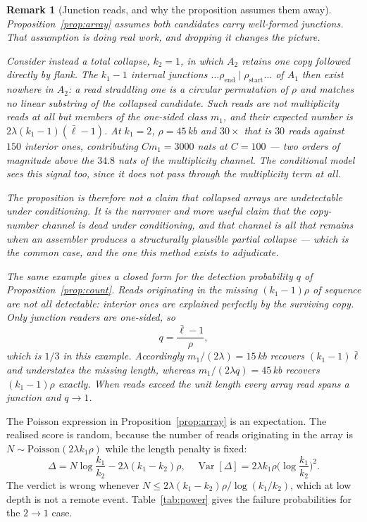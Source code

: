 \documentclass[11pt]{article}
\newtheorem{remark}{Remark}
\begin{document}
\begin{remark}[Junction reads, and why the proposition assumes them away]
\label{rem:junction}
Proposition~\ref{prop:array} assumes both candidates carry well-formed
junctions.  That assumption is doing real work, and dropping it changes the
picture.

Consider instead a \emph{total} collapse, $k_2 = 1$, in which $A_2$ retains one
copy followed directly by flank.  The $k_1-1$ internal junctions
$\ldots\rho_{\mathrm{end}}\mid\rho_{\mathrm{start}}\ldots$ of $A_1$ then exist
nowhere in $A_2$: a read straddling one is a circular permutation of $\rho$ and
matches no linear substring of the collapsed candidate.  Such reads are not
multiplicity reads at all but members of the one-sided class $m_1$, and their
expected number is $2\lambda(k_1-1)(\bar\ell-1)$.  At $k_1=2$,
$\rho=45$\,kb and $30\times$ that is $30$ reads against $150$ interior ones,
contributing $C m_1 = 3000$ nats at $C=100$ --- two orders of magnitude above
the $34.8$ nats of the multiplicity channel.  The conditional model sees this
signal too, since it does not pass through the multiplicity term at all.

The proposition is therefore not a claim that collapsed arrays are undetectable
under conditioning.  It is the narrower and more useful claim that the
\emph{copy-number channel} is dead under conditioning, and that channel is all
that remains when an assembler produces a structurally plausible partial
collapse --- which is the common case, and the one this method exists to
adjudicate.

The same example gives a closed form for the detection probability $q$ of
Proposition~\ref{prop:count}.  Reads originating in the missing $(k_1-1)\rho$
of sequence are not all detectable: interior ones are explained perfectly by
the surviving copy.  Only junction readers are one-sided, so
\begin{equation}
    q = \frac{\bar\ell-1}{\rho},
\end{equation}
which is $1/3$ in this example.  Accordingly $m_1/(2\lambda) = 15$\,kb
recovers $(k_1-1)\bar\ell$ and understates the missing length, whereas
$m_1/(2\lambda q) = 45$\,kb recovers $(k_1-1)\rho$ exactly.  When reads exceed
the unit length every array read spans a junction and $q \to 1$.
\end{remark}

The Poisson expression in Proposition~\ref{prop:array} is an expectation.  The
realised score is random, because the number of reads originating in the array
is $N \sim \text{Poisson}(2\lambda k_1\rho)$ while the length penalty is fixed:
\begin{equation}
    \Delta = N\log\frac{k_1}{k_2} - 2\lambda(k_1-k_2)\rho,
    \quad
    \operatorname{Var}[\Delta] = 2\lambda k_1\rho\Big(\log\frac{k_1}{k_2}\Big)^2 .
\label{eq:array-moments}
\end{equation}
The verdict is wrong whenever $N \le 2\lambda(k_1-k_2)\rho/\log(k_1/k_2)$,
which at low depth is not a remote event.  Table~\ref{tab:power} gives the
failure probabilities for the $2\to1$ case.
\end{document}

